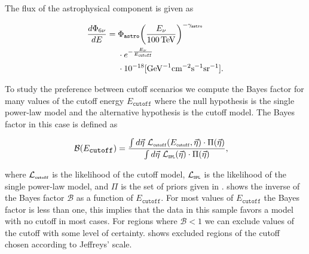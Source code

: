 The flux of the astrophysical component is given as
\begin{linenomath*}
	\begin{equation}
	\begin{split}
	\frac{d\Phi_{6\nu}}{dE}={}&\Phi_\texttt{astro}{\left(\frac{E_\nu}{\SI{100}\TeV}\right)}^{-\gamma_\texttt{astro}} \\ & \cdot e^{-\frac{E_{\nu}}{E_\texttt{cutoff}}} \\ & \cdot 10^{-18}[\textmd{GeV}^{-1}\textmd{cm}^{-2}\textmd{s}^{-1}\textmd{sr}^{-1}].
	\end{split}\label{eq:cutoff_flux}
	\end{equation}
\end{linenomath*}

To study the preference between cutoff scenarios we compute the Bayes factor for many values of the cutoff energy $E_\texttt{cutoff}$ where the null hypothesis is the single power-law model and the alternative hypothesis is the cutoff model.
The Bayes factor in this case is defined as
\begin{linenomath*}
	\begin{equation}
	\begin{split}
	\mathcal{B}(E_\texttt{\small{cutoff}}) ={}& \frac{\int d\vec\eta~\mathcal{L}_\texttt{\tiny{cutoff}}(E_\texttt{\tiny{cutoff}},\vec\eta)\cdot\Pi(\vec\eta)}{\int d\vec\eta~\mathcal{L}_\texttt{\tiny{SPL}}(\vec\eta)\cdot\Pi(\vec\eta)},
	\end{split}\label{eq:cutoff_bayes_factor}
	\end{equation}
\end{linenomath*}
where $\mathcal{L}_\texttt{\tiny{cutoff}}$ is the likelihood of the cutoff model, $\mathcal{L}_\texttt{\tiny{SPL}}$ is the likelihood of the single power-law model, and $\Pi$ is the set of priors given in .
 shows the inverse of the Bayes factor $\mathcal{B}$ as a function of $E_\texttt{cutoff}$.
For most values of $E_\texttt{cutoff}$ the Bayes factor is less than one, this implies that the data in this sample favors a model with no cutoff in most cases.
For regions where $\mathcal{B} < 1$ we can exclude values of the cutoff with some level of certainty.
 shows excluded regions of the cutoff chosen according to Jeffreys' scale.

